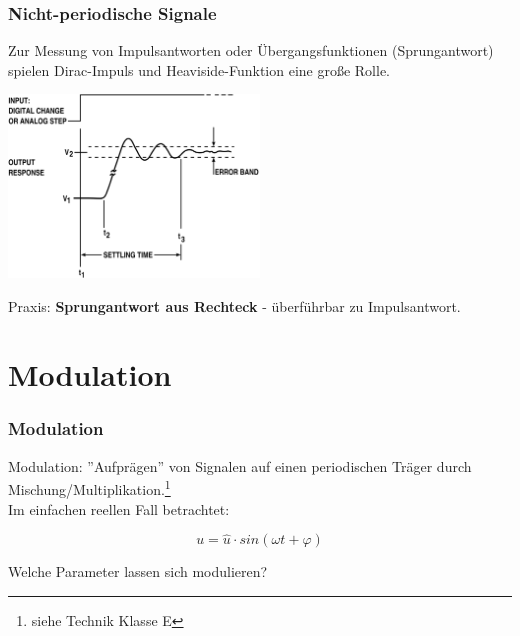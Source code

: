 \begin{frame}
    \frametitle{Nicht-periodische Signale}

    Zur Messung von Impulsantworten oder Übergangsfunktionen (Sprungantwort)
    spielen Dirac-Impuls und Heaviside-Funktion eine große Rolle. \\[2em]

    \begin{center}
        \includegraphics[width=0.5\textwidth]{a11/High_accuracy_settling_time_measurements_figure_1.png}
        \tiny \hyperlink{refs}{\cite{wc}}
    \end{center}

    Praxis: \textbf{Sprungantwort aus Rechteck} - überführbar zu Impulsantwort.

\end{frame}


\section{Modulation}

\begin{frame}
    \frametitle{Modulation}

    Modulation: ''Aufprägen'' von Signalen auf einen periodischen Träger durch
    Mischung/Multiplikation.\footnote{siehe Technik Klasse E} %
    \\[2em]

    Im einfachen reellen Fall betrachtet:

    \begin{equation*}
        u = \hat{u} \cdot sin(\omega t + \varphi)
    \end{equation*}

    \vspace{2em}
    Welche Parameter lassen sich modulieren?

\end{frame}


